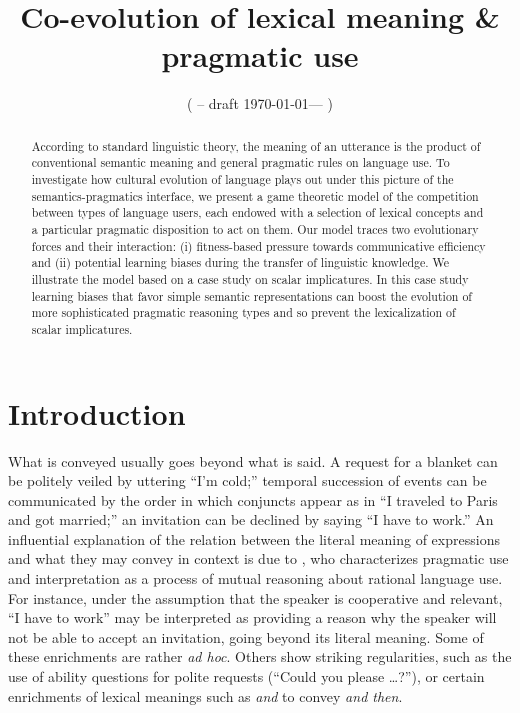 \documentclass[a4paper, 11pt]{article}
\title{Co-evolution of lexical meaning \& pragmatic use}
\author{%
    ( -- draft \today --- )
}
\date{}
\theoremstyle{Satz}
\begin{document}

\maketitle

\begin{abstract}
  According to standard linguistic theory, the meaning of an utterance is the product of
  conventional semantic meaning and general pragmatic rules on language use. To investigate how
  cultural evolution of language plays out under this picture of the semantics-pragmatics
  interface, we present a game theoretic model of the competition between types of language
  users, each endowed with a selection of lexical concepts and a particular pragmatic
  disposition to act on them. Our model traces two evolutionary forces and their interaction:
  (i) fitness-based pressure towards communicative efficiency and (ii) potential learning
  biases during the transfer of linguistic knowledge. We illustrate the model based on a case
  study on scalar implicatures. In this case study learning biases that favor simple semantic
  representations can boost the evolution of more sophisticated pragmatic reasoning types and
  so prevent the lexicalization of scalar implicatures.
\end{abstract}

\section{Introduction}\label{sec:introduction}
What is conveyed usually goes beyond what is said. A request for a blanket can be politely
veiled by uttering ``I'm cold;'' temporal succession of events can be communicated by the order
in which conjuncts appear as in ``I traveled to Paris and got married;'' an invitation can be
declined by saying ``I have to work.'' An influential explanation of the relation between the
literal meaning of expressions and what they may convey in context is due to
\citet{grice:1975}, who characterizes pragmatic use and interpretation as a process of mutual
reasoning about rational language use. For instance, under the assumption that the speaker is
cooperative and relevant, ``I have to work'' may be interpreted as providing a reason why the
speaker will not be able to accept an invitation, going beyond its literal meaning. Some of
these enrichments are rather \emph{ad hoc}. Others show striking regularities, such as the use
of ability questions for polite requests (``Could you please \dots?''), or certain enrichments
of lexical meanings such as \emph{and} to convey \emph{and then}.
\end{document}
